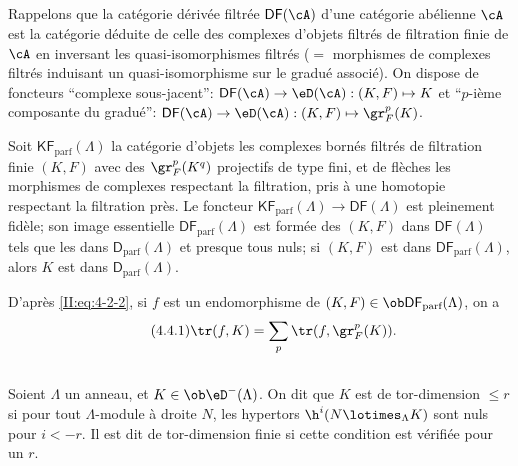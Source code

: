 \subsection{}\label{II:4-4}

Rappelons que la catégorie dérivée filtrée $\mathsf{DF}(\cA)$ d'une catégorie 
abélienne $\cA$ est la catégorie déduite de celle des complexes d'objets 
filtrés de filtration finie de $\cA$ en inversant les quasi-isomorphismes 
filtrés ($=$ morphismes de complexes filtrés induisant un quasi-isomorphisme 
sur le gradué associé). On dispose de foncteurs ``complexe sous-jacent'': 
$\mathsf{DF}(\cA)\to\eD(\cA): (K,F)\mapsto K$ et ``$p$-ième composante du 
gradué'': $\mathsf{DF}(\cA)\to\eD(\cA): (K,F)\mapsto \gr_F^p(K)$. 

Soit $\mathsf{KF}_\text{parf}(\Lambda)$ la catégorie d'objets les complexes 
bornés filtrés de filtration finie $(K,F)$ avec des $\gr_F^p(K^q)$ projectifs 
de type fini, et de flèches les morphismes de complexes respectant la 
filtration, pris à une homotopie respectant la filtration près. Le foncteur 
$\mathsf{KF}_\text{parf}(\Lambda)\to\mathsf{DF}(\Lambda)$ est pleinement fidèle; 
son image essentielle $\mathsf{DF}_\text{parf}(\Lambda)$ est formée des $(K,F)$ dans 
$\mathsf{DF}(\Lambda)$ tels que les  dans 
$\mathsf{D}_\text{parf}(\Lambda)$ et presque tous nuls; si $(K,F)$ est dans 
$\mathsf{DF}_\text{parf}(\Lambda)$, alors $K$ est dans 
$\mathsf{D}_\text{parf}(\Lambda)$. 

D'après \eqref{II:eq:4-2-2}, si $f$ est un endomorphisme de 
$(K,F)\in\ob\mathsf{DF}_\text{parf}(\Lambda)$, on a 
\begin{equation*}\tag{4.4.1}\label{II:eq:4-4-1}
 \tr(f,K) = \sum_p \tr(f,\gr_F^p(K)) \text{.}
\end{equation*}





\subsection{}\label{II:4-5}

Soient $\Lambda$ un anneau, et $K\in\ob\eD^-(\Lambda)$. On dit que $K$ est de 
tor-dimension $\leqslant r$ si pour tout $\Lambda$-module à droite $N$, les 
hypertors $\h^i(N\lotimes_\Lambda K)$ sont nuls pour $i<-r$. Il est dit de 
tor-dimension finie si cette condition est vérifiée pour un $r$. 

